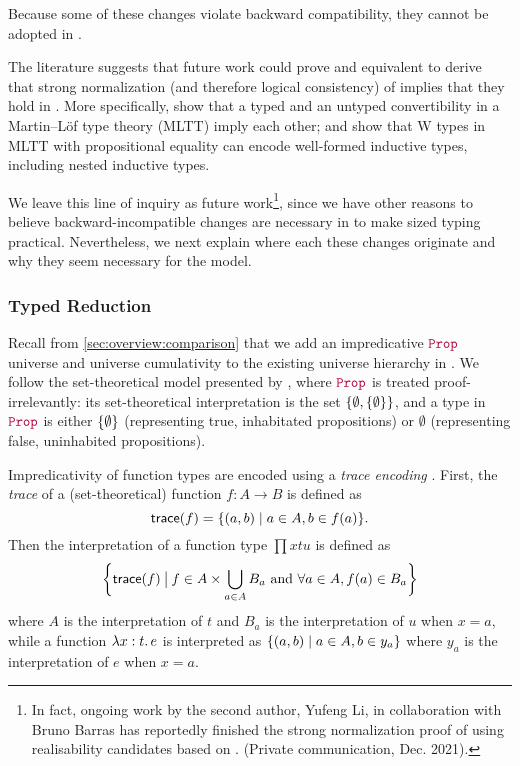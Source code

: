 Because some of these changes violate backward compatibility, they cannot be
adopted in \lang.

The literature suggests that future work could prove \langAnother and \lang
equivalent to derive that strong normalization (and therefore logical
consistency) of \langAnother implies that they hold in \lang.
More specifically, \cite{conversion} show that a typed and an untyped convertibility in a Martin--L\"of type theory (MLTT) imply each other;
and \citet{whynotW, polynomial-functors-w} show that W types in MLTT with propositional equality
can encode well-formed inductive types, including nested inductive types.

We leave this line of inquiry as future work\footnote{In fact, ongoing work by
  the second author, Yufeng Li, in collaboration with Bruno Barras has reportedly
  finished the strong normalization proof of \langAnother using realisability
  candidates based on \citet{barras-thesis}. (Private
  communication, Dec. 2021).}, since we have other reasons to believe backward-incompatible
  changes are necessary in \lang to make sized typing practical.
Nevertheless, we next explain where each these changes originate and why they
seem necessary for the model.

\subsubsection{Typed Reduction}

Recall from \autoref{sec:overview:comparison} that we add an impredicative $\Prop$ universe
and universe cumulativity to the existing universe hierarchy in \CIChatminus.
We follow the set-theoretical model presented by \citet{not-so-simple-cc},
where $\Prop$ is treated proof-irrelevantly:
its set-theoretical interpretation is the set $\{\emptyset, \{\emptyset\}\}$,
and a type in $\Prop$ is either $\{\emptyset\}$ (representing true, inhabitated propositions)
or $\emptyset$ (representing false, uninhabited propositions).

Impredicativity of function types are encoded using a \emph{trace encoding} \citep{aczel-trace}.
First, the \emph{trace} of a (set-theoretical) function $f : A \to B$ is defined as
$$\textsf{trace}(f) = \{(a, b) \mid a \in A, b \in f(a)\}.$$
Then the interpretation of a function type $\prod{x}{t}{u}$ is defined as
$$\bigg\{\textsf{trace}(f) \mathbin{\big|} f \in A \times \bigcup_{a \in A} B_a \text{ and } \forall a \in A, f(a) \in B_a\bigg\}$$
where $A$ is the interpretation of $t$ and $B_a$ is the interpretation of $u$ when $x = a$,
while a function $\lambda x : t \mathpunct{.} e$ is interpreted as
$\{(a, b) \mid a \in A, b \in y_a\}$
where $y_a$ is the interpretation of $e$ when $x = a$.

